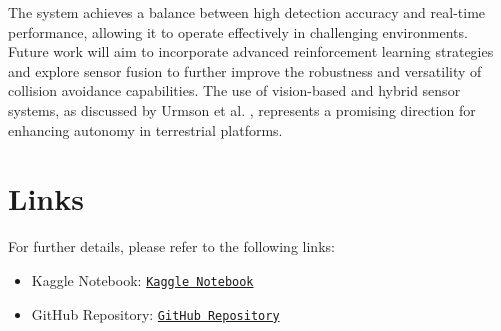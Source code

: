 \documentclass[12pt]{article}
\begin{document}
The system achieves a balance between high detection accuracy and real-time performance, allowing it to operate effectively in challenging environments. Future work will aim to incorporate advanced reinforcement learning strategies and explore sensor fusion to further improve the robustness and versatility of collision avoidance capabilities. The use of vision-based and hybrid sensor systems, as discussed by Urmson et al. \cite{urmson2006robust}, represents a promising direction for enhancing autonomy in terrestrial platforms.

\newpage
\appendix
\section{Links}

For further details, please refer to the following links:

\begin{itemize}
    \item Kaggle Notebook: \href{https://www.kaggle.com/code/sakibsadmanshajib/cav-object-detection/}{\texttt{Kaggle Notebook}}
    \item GitHub Repository: \href{https://github.com/sakibsadmanshajib/Real-Time-Object-Detection-for-Collision-Avoidance}{\texttt{GitHub Repository}}
\end{itemize}

\newpage


\end{document}
